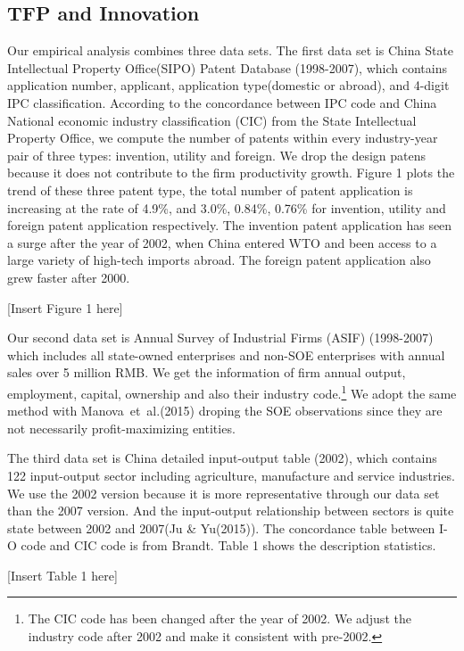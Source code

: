 \documentclass[12pt]{article}%
\begin{document}
\begin{CJK*}{GBK}{fs}
\subsection{TFP and Innovation}
Our empirical analysis combines three data sets. The first data set is China State Intellectual Property Office(SIPO) Patent Database (1998-2007), which contains application number, applicant, application type(domestic or abroad), and 4-digit IPC classification. According to the concordance between IPC code and China National economic industry classification (CIC) from the State Intellectual Property Office, we compute the number of patents within every industry-year pair of three types: invention, utility and foreign. We drop the design patens because it does not contribute to the firm productivity growth. Figure 1 plots the trend of these three patent type, the total number of patent application is increasing at the rate of 4.9\%, and 3.0\%, 0.84\%, 0.76\% for invention, utility and foreign patent application respectively. The invention patent application has seen a surge after the year of 2002, when China entered WTO and been access to a large variety of high-tech imports abroad. The foreign patent application also grew faster after 2000.    \par
\begin{center}
  [Insert Figure 1 here]
\end{center}
\par Our second data set is Annual Survey of Industrial Firms (ASIF) (1998-2007) which includes all state-owned enterprises and non-SOE enterprises with annual sales over 5 million RMB. We get the information of firm annual output, employment, capital, ownership and also their industry code.\footnote{\scriptsize The CIC code has been changed after the year of 2002. We adjust the industry code after 2002 and make it consistent with pre-2002.} We adopt the same method with \textcolor[rgb]{0.00,0.07,1.00}{Manova~et~al.(2015)} droping the SOE observations since they are not necessarily profit-maximizing entities.\par
The third data set is China detailed input-output table (2002), which contains 122 input-output sector including agriculture, manufacture and service industries. We use the 2002 version because it is more representative through our data set than the 2007 version. And the input-output relationship between sectors is quite state between 2002 and 2007(\textcolor[rgb]{0.00,0.07,1.00}{Ju \& Yu(2015)}). The concordance table between I-O code and CIC code is from Brandt. Table 1 shows the description statistics.
\begin{center}
  [Insert Table 1 here]
\end{center}



\end{CJK*}
\end{document}
